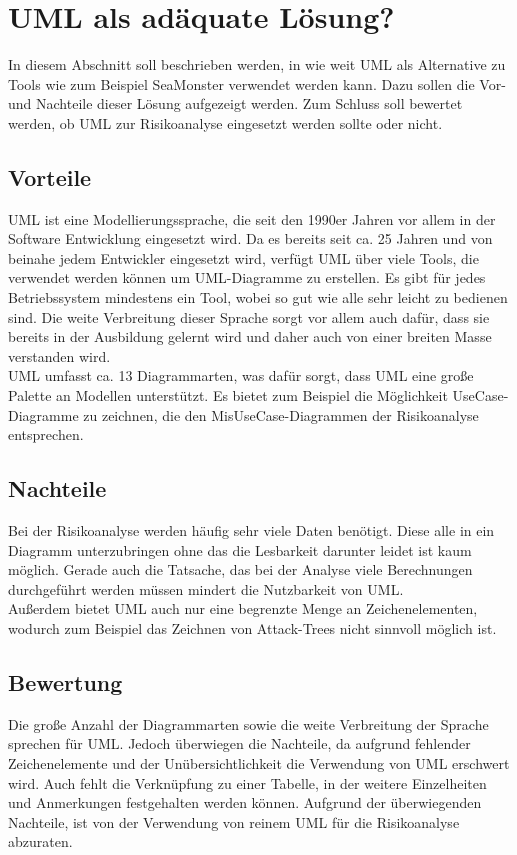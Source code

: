 \section{UML als adäquate Lösung?}
In diesem Abschnitt soll beschrieben werden, in wie weit UML als Alternative zu Tools wie zum Beispiel SeaMonster verwendet werden kann. Dazu sollen die Vor- und Nachteile dieser Lösung aufgezeigt werden. Zum Schluss soll bewertet werden, ob UML zur Risikoanalyse eingesetzt werden sollte oder nicht.

\subsection{Vorteile}
UML ist eine Modellierungssprache, die seit den 1990er Jahren vor allem in der Software Entwicklung eingesetzt wird. Da es bereits seit ca. 25 Jahren und von beinahe jedem Entwickler eingesetzt wird, verfügt UML über viele Tools, die verwendet werden können um UML-Diagramme zu erstellen. Es gibt für jedes Betriebssystem mindestens ein Tool, wobei so gut wie alle sehr leicht zu bedienen sind. Die weite Verbreitung dieser Sprache sorgt vor allem auch dafür, dass sie bereits in der Ausbildung gelernt wird und daher auch von einer breiten Masse verstanden wird.\\
UML umfasst ca. 13 Diagrammarten, was dafür sorgt, dass UML eine große Palette an Modellen unterstützt. Es bietet zum Beispiel die Möglichkeit UseCase-Diagramme zu zeichnen, die den MisUseCase-Diagrammen der Risikoanalyse entsprechen.

\subsection{Nachteile}
Bei der Risikoanalyse werden häufig sehr viele Daten benötigt. Diese alle in ein Diagramm unterzubringen ohne das die Lesbarkeit darunter leidet ist kaum möglich. Gerade auch die Tatsache, das bei der Analyse viele Berechnungen durchgeführt werden müssen mindert die Nutzbarkeit von UML.\\
Außerdem bietet UML auch nur eine begrenzte Menge an Zeichenelementen, wodurch zum Beispiel das Zeichnen von Attack-Trees nicht sinnvoll möglich ist.

\subsection{Bewertung}
Die große Anzahl der Diagrammarten sowie die weite Verbreitung der Sprache sprechen für UML. Jedoch überwiegen die Nachteile, da aufgrund fehlender Zeichenelemente und der Unübersichtlichkeit die Verwendung von UML erschwert wird. Auch fehlt die Verknüpfung zu einer Tabelle, in der weitere Einzelheiten und Anmerkungen festgehalten werden können. Aufgrund der überwiegenden Nachteile, ist von der Verwendung von reinem UML für die Risikoanalyse abzuraten.